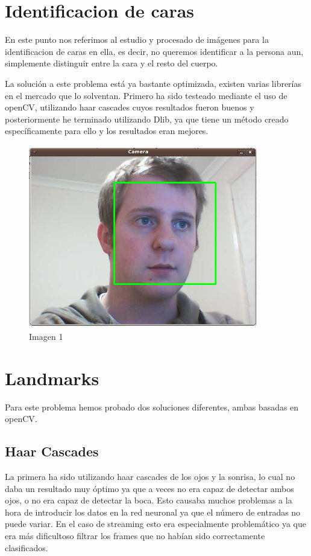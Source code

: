 \documentclass{article}
\begin{document}
\section{Identificacion de caras}
En este punto nos referimos al estudio y procesado de imágenes para la identificacion de caras en ella, es decir, no queremos identificar a la persona aun, simplemente distinguir entre la cara y el resto del cuerpo.

La solución a este problema está ya bastante optimizada, existen varias librerías en el mercado que lo solventan. Primero ha sido testeado mediante el uso de openCV, utilizando haar cascades cuyos resultados fueron buenos y posteriormente he terminado utilizando Dlib, ya que tiene un método creado específicamente para ello y los resultados eran mejores.

\begin{figure}[H]
  \centering
  \includegraphics[width=100mm, height=80mm]{images/face-detect_square.png}
  \caption{Imagen 1}
\end{figure}

\section{Landmarks}
Para este problema hemos probado dos soluciones diferentes, ambas basadas en openCV.  

\subsection{Haar Cascades}
La primera ha sido utilizando haar cascades de los ojos y la sonrisa, lo cual no daba un resultado muy óptimo ya que a veces no era capaz de detectar ambos ojos, o no era capaz de detectar la boca. Esto causaba muchos problemas a la hora de introducir los datos en la red neuronal ya que el número de entradas no puede variar. En el caso de streaming esto era especialmente problemático ya que era más dificultoso filtrar los frames que no habían sido correctamente clasificados.
\end{document}
